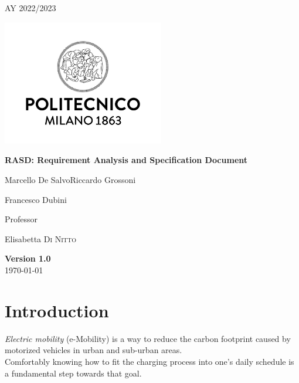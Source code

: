 \documentclass[table, 12pt]{article} %
\begin{document}
    
    \begin{titlepage}
        \centering
        {\scshape\large AY 2022/2023 \par}
        \vfill
        \includegraphics[width=200pt]{assets/logo_polimi}\par\vspace{1cm}
        \vspace{0.5cm}
        {\huge\bfseries RASD\@: Requirement Analysis
            and Specification Document \par}
        \vspace{1cm}
        {\large {Marcello De Salvo\quad Riccardo Grossoni \par Francesco Dubini}\par}
        \vfill
        {\large Professor\par
            Elisabetta \textsc{Di Nitto}}
        \vfill
        {\large \textbf{Version 1.0}\\ \today \par}
    \end{titlepage}
    
    \thispagestyle{plain}

    \mbox{}

    \newpage
    \tableofcontents

    \newpage

    \section{Introduction}
        \emph{Electric mobility} (e-Mobility) is a way to reduce the carbon footprint caused by motorized vehicles in urban and sub-urban areas.\\
        Comfortably knowing how to fit the charging process into one's daily schedule is a fundamental step towards that goal.
        
\end{document}
